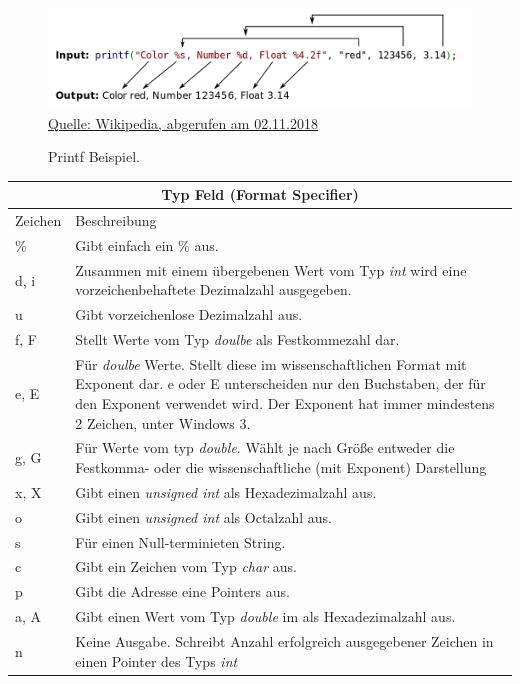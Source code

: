 \documentclass[a4paper,10pt]{article}
\begin{document}
\begin{figure}[H]
  \caption{Printf Beispiel.}
  \centering
    \includegraphics[width=.8\textwidth]{printf}
    \\
  \href{https://commons.wikimedia.org/wiki/File:Printf.svg}{Quelle: Wikipedia, abgerufen am 02.11.2018}
\end{figure}
\begin{center}
    \begin{tabularx}{\textwidth}{|l|X|}
        \hline
        \multicolumn{2}{|c|}{Typ Feld (Format Specifier)} \\
        \hline
            Zeichen   & Beschreibung\\
        \hline
            \%       & Gibt einfach ein \% aus.\\
            d, i           & Zusammen mit einem übergebenen Wert vom Typ \textit{int} wird eine vorzeichenbehaftete
                             Dezimalzahl ausgegeben.\\
            u              & Gibt vorzeichenlose Dezimalzahl aus.\\
            f, F           & Stellt Werte vom Typ \textit{doulbe} als Festkommezahl dar.\\
            e, E           & Für \textit{doulbe} Werte. Stellt diese im wissenschaftlichen Format mit Exponent dar.
                             e oder E unterscheiden nur den Buchstaben, der für den Exponent verwendet wird. Der Exponent hat immer mindestens 2 Zeichen, unter Windows 3.\\
            g, G           & Für Werte vom typ \textit{double}. Wählt je nach Größe entweder die Festkomma- oder die
                            wissenschaftliche (mit Exponent) Darstellung \\
            x, X           & Gibt einen \textit{unsigned int} als Hexadezimalzahl aus.\\
            o              & Gibt einen \textit{unsigned int} als Octalzahl aus.\\
            s              & Für einen Null-terminieten String.\\  
            c              & Gibt ein Zeichen vom Typ \textit{char} aus.\\ 
            p              & Gibt die Adresse eine Pointers aus.\\
            a, A           & Gibt einen Wert vom Typ \textit{double} im als Hexadezimalzahl aus.\\
            n              & Keine Ausgabe. Schreibt Anzahl erfolgreich ausgegebener Zeichen in einen Pointer des
                             Typs \textit{int}\\
        \hline
    \end{tabularx}
\end{center}
\end{document}
